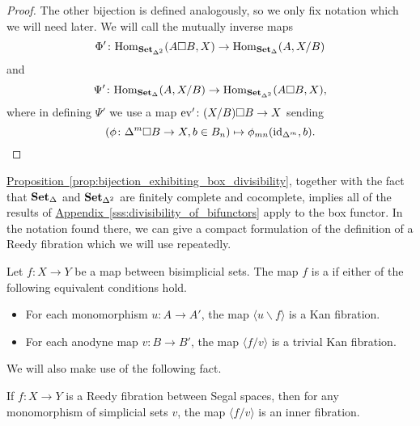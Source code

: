\documentclass[main.tex]{subfiles}
\begin{document}
\begin{proof}
  The other bijection is defined analogously, so we only fix notation which we will need later. We will call the mutually inverse maps
  \begin{equation*}
    \Phi'\colon \mathrm{Hom}_{\mathbf{Set}_{\Delta^{2}}}(A \square B, X) \to \mathrm{Hom}_{\mathbf{Set}_{\Delta}}(A, X / B)
  \end{equation*}
  and
  \begin{equation*}
    \Psi'\colon \mathrm{Hom}_{\mathbf{Set}_{\Delta}}(A, X / B) \to \mathrm{Hom}_{\mathbf{Set}_{\Delta^{2}}}(A \square B, X),
  \end{equation*}
  where in defining $\Psi'$ we use a map $\mathrm{ev}'\colon (X / B) \square B \to X$ sending
  \begin{equation*}
    (\phi\colon \Delta^{m} \square B \to X, b \in B_{n}) \mapsto \phi_{mn}(\mathrm{id}_{\Delta^{m}}, b).\qedhere
  \end{equation*}
\end{proof}


\hyperref[prop:bijection_exhibiting_box_divisibility]{Proposition~\ref*{prop:bijection_exhibiting_box_divisibility}}, together with the fact that $\mathbf{Set}_{\Delta}$ and $\mathbf{Set}_{\Delta^{2}}$ are finitely complete and cocomplete, implies all of the results of \hyperref[sss:divisibility_of_bifunctors]{Appendix~\ref*{sss:divisibility_of_bifunctors}} apply to the box functor. In the notation found there, we can give a compact formulation of the definition of a Reedy fibration which we will use repeatedly.

\begin{definition}
  \label{def:reedy_fibration}
  Let $f\colon X \to Y$ be a map between bisimplicial sets. The map $f$ is a  if either of the following equivalent conditions hold.
  \begin{itemize}
    \item For each monomorphism $u\colon A \to A'$, the map $\langle u \backslash f \rangle$ is a Kan fibration.

    \item For each anodyne map $v\colon B \to B'$, the map $\langle f / v \rangle$ is a trivial Kan fibration.
  \end{itemize}
\end{definition}

We will also make use of the following fact.

\begin{theorem}
  \label{thm:inner_fibration_between_quasicategories}
  If $f\colon X \to Y$ is a Reedy fibration between Segal spaces, then for any monomorphism of simplicial sets $v$, the map $\langle f / v \rangle$ is an inner fibration.
\end{theorem}
\end{document}
